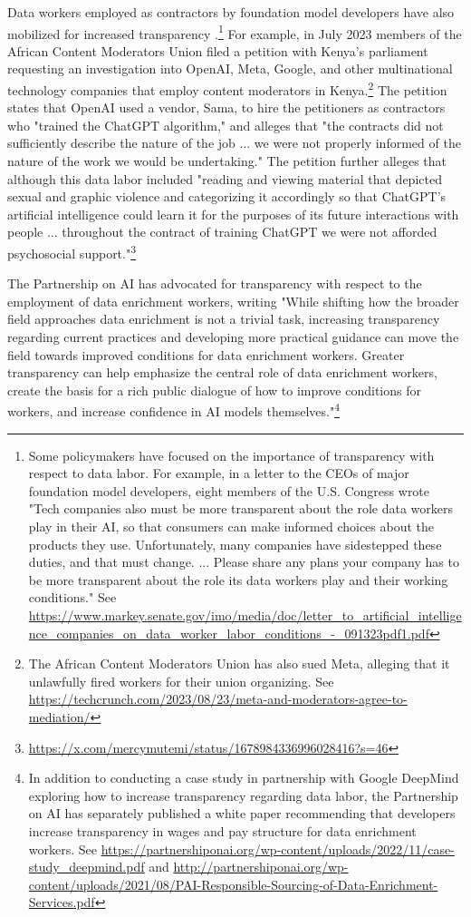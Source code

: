 Data workers employed as contractors by foundation model developers have also mobilized for increased transparency \citep{gray_ghost_2019}.\footnote{Some policymakers have focused on the importance of transparency with respect to data labor. For example, in a letter to the CEOs of major foundation model developers, eight members of the U.S. Congress wrote "Tech companies also must be more transparent about the role data workers play in their AI, so that consumers can make informed choices about the products they use. Unfortunately, many companies have sidestepped these duties, and that must change. ... Please share any plans your company has to be more transparent about the role its data workers play and their working conditions." See \url{https://www.markey.senate.gov/imo/media/doc/letter_to_artificial_intelligence_companies_on_data_worker_labor_conditions_-_091323pdf1.pdf}}
For example, in July 2023 members of the African Content Moderators Union filed a petition with Kenya's parliament requesting an investigation into OpenAI, Meta, Google, and other multinational technology companies that employ content moderators in Kenya.\footnote{The African Content Moderators Union has also sued Meta, alleging that it unlawfully fired workers for their union organizing. See \url{https://techcrunch.com/2023/08/23/meta-and-moderators-agree-to-mediation/}} 
The petition states that OpenAI used a vendor, Sama, to hire the petitioners as contractors who "trained the ChatGPT algorithm," and alleges that "the contracts did not sufficiently describe the nature of the job ... we were not properly informed of the nature of the work we would be undertaking." The petition further alleges that although this data labor included "reading and viewing material that depicted sexual and graphic violence and categorizing it accordingly so that ChatGPT's artificial intelligence could learn it for the purposes of its future interactions with people ... throughout the contract of training ChatGPT we were not afforded psychosocial support."\footnote{\url{https://x.com/mercymutemi/status/1678984336996028416?s=46}}

The Partnership on AI has advocated for transparency with respect to the employment of data enrichment workers, writing "While shifting how the broader field approaches data enrichment is not a trivial task, increasing transparency regarding current practices and developing more practical guidance can move the field towards improved conditions for data enrichment workers. Greater transparency can help emphasize the central role of data enrichment workers, create the basis for a rich public dialogue of how to improve conditions for workers, and increase confidence in AI models themselves."\footnote{In addition to conducting a case study in partnership with Google DeepMind exploring how to increase transparency regarding data labor, the Partnership on AI has separately published a white paper recommending that developers increase transparency in wages and pay structure for data enrichment workers. See \url{https://partnershiponai.org/wp-content/uploads/2022/11/case-study_deepmind.pdf} and \url{http://partnershiponai.org/wp-content/uploads/2021/08/PAI-Responsible-Sourcing-of-Data-Enrichment-Services.pdf}}


